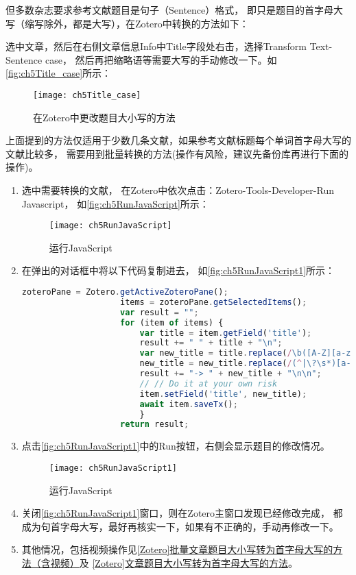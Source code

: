 \documentclass[cn,11pt,chinese]{elegantbook}
\begin{document}
			但多数杂志要求参考文献题目是句子（Sentence）格式，
			即只是题目的首字母大写（缩写除外，都是大写），在Zotero中转换的方法如下：
			
			选中文章，然后在右侧文章信息Info中Title字段处右击，选择Transform Text-Sentence case，
			然后再把缩略语等需要大写的手动修改一下。如\autoref{fig:ch5Title_case}所示：
			
				\begin{figure}[htbp]
					\centering
					\texttt{[image: ch5Title\_case]}
					\caption{在Zotero中更改题目大小写的方法}
					\label{fig:ch5Title_case}
				\end{figure}

				
			上面提到的方法仅适用于少数几条文献，如果参考文献标题每个单词首字母大写的文献比较多，
			需要用到批量转换的方法(操作有风险，建议先备份库再进行下面的操作)。
			\begin{enumerate}
				\item 选中需要转换的文献，
				在Zotero中依次点击：Zotero-Tools-Developer-Run Javascript，
				如\autoref{fig:ch5RunJavaScript}所示：

				  \begin{figure}[htbp]
					  \centering
					  \texttt{[image: ch5RunJavaScript]}
					  \caption{运行JavaScript}
					  \label{fig:ch5RunJavaScript}
				  \end{figure}
				\item 在弹出的对话框中将以下代码复制进去，
				如\autoref{fig:ch5RunJavaScript1}所示：
				
				\begin{lstlisting}[language=JavaScript]
					zoteroPane = Zotero.getActiveZoteroPane();
					items = zoteroPane.getSelectedItems();
					var result = "";
					for (item of items) {
						var title = item.getField('title');
						result += " " + title + "\n";
						var new_title = title.replace(/\b([A-Z][a-z0-9]+|A)\b/g, function (x) { return x.toLowerCase(); });
						new_title = new_title.replace(/(^|\?\s*)[a-z]/, function (x) { return x.toUpperCase(); });
						result += "-> " + new_title + "\n\n";
						// // Do it at your own risk
						item.setField('title', new_title);
						await item.saveTx();
						}
					return result;
				\end{lstlisting}
				\item 点击\autoref{fig:ch5RunJavaScript1}中的Run按钮，右侧会显示题目的修改情况。
						\begin{figure}[htbp]
							\centering
							\texttt{[image: ch5RunJavaScript1]}
							\caption{运行JavaScript}
							\label{fig:ch5RunJavaScript1}
						\end{figure}
				\item 关闭\autoref{fig:ch5RunJavaScript1}窗口，则在Zotero主窗口发现已经修改完成，
				都成为句首字母大写，最好再核实一下，如果有不正确的，手动再修改一下。
				\item 其他情况，包括视频操作见\href{https://zhuanlan.zhihu.com/p/283889592}
				{[Zotero]批量文章题目大小写转为首字母大写的方法（含视频）}及
				\href{https://zhuanlan.zhihu.com/p/60651053}
				{[Zotero]文章题目大小写转为首字母大写的方法}。
		    \end{enumerate}
			
\end{document}
